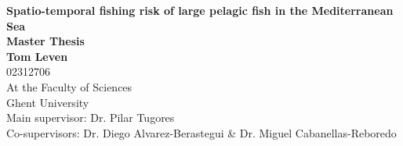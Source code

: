 \begin{titlepage}
\vspace{2cm} 
  
  \begin{center}
    {\LARGE \textbf{Spatio-temporal fishing risk of large pelagic fish in the Mediterranean Sea}}\\[1cm]
  
    \textbf{Master Thesis}\\
    \textbf{Tom Leven}\\[0.5cm]
    02312706\\[1.5cm]
  
    At the Faculty of Sciences\\
    Ghent University\\[1.5cm]
  
    Main supervisor: Dr. Pilar Tugores\\
    Co-supervisors: Dr. Diego Alvarez-Berastegui \& Dr. Miguel Cabanellas-Reboredo

    \end{center}

\end{titlepage}
\restoregeometry
